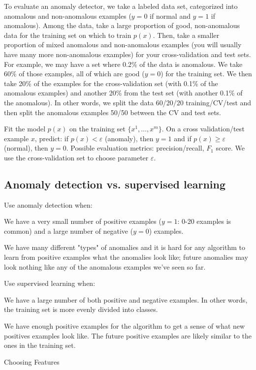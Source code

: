 \documentclass[a4paper,11pt]{report}
\begin{document}
To evaluate an anomaly detector, we take a labeled data set, categorized into anomalous and non-anomalous examples ($y = 0$ if normal and $y = 1$ if anomalous). Among the data, take a large proportion of good, non-anomalous data for the training set on which to train $p(x)$. Then, take a smaller proportion of mixed anomalous and non-anomalous examples (you will usually have many more non-anomalous examples) for your cross-validation and test sets. For example, we may have a set where 0.2\% of the data is anomalous. We take 60\% of those examples, all of which are good ($y=0$) for the training set. We then take 20\% of the examples for the cross-validation set (with 0.1\% of the anomalous examples) and another 20\% from the test set (with another 0.1\% of the anomalous). In other words, we split the data 60/20/20 training/CV/test and then split the anomalous examples 50/50 between the CV and test sets.

Fit the model $p(x)$ on the training set $\{x^1,\ldots ,x^m\}$. On a cross validation/test example $x$, predict: if $p(x) < \varepsilon$ (anomaly), then $y=1$ and if $p(x) ≥ \varepsilon$ (normal), then $y=0$. Possible evaluation metrics: precision/recall, $F_1$ score. We use the cross-validation set to choose parameter $\varepsilon$.

\subsection*{Anomaly detection vs. supervised learning}

Use anomaly detection when:

We have a very small number of positive examples ($y=1$: 0-20 examples is common) and a large number of negative ($y=0$) examples.

We have many different "types" of anomalies and it is hard for any algorithm to learn from positive examples what the anomalies look like; future anomalies may look nothing like any of the anomalous examples we've seen so far.

Use supervised learning when:

We have a large number of both positive and negative examples. In other words, the training set is more evenly divided into classes.

We have enough positive examples for the algorithm to get a sense of what new positives examples look like. The future positive examples are likely similar to the ones in the training set.

Choosing Features
\end{document}
